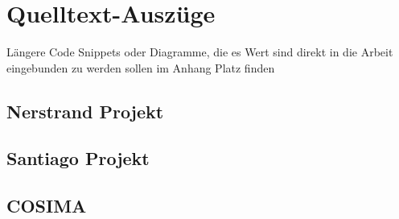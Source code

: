 
\chapter{Quelltext-Auszüge} %
\label{cha:quelltext_auszuege}

  Längere Code Snippets oder Diagramme, die es Wert sind direkt in die Arbeit eingebunden zu werden sollen im Anhang Platz finden
  
\section{Nerstrand Projekt} %
\label{sec:nerstrand_projekt}


\section{Santiago Projekt} %
\label{sec:santiago_projekt}


\section{COSIMA} %
\label{sec:cosima_architektur}



